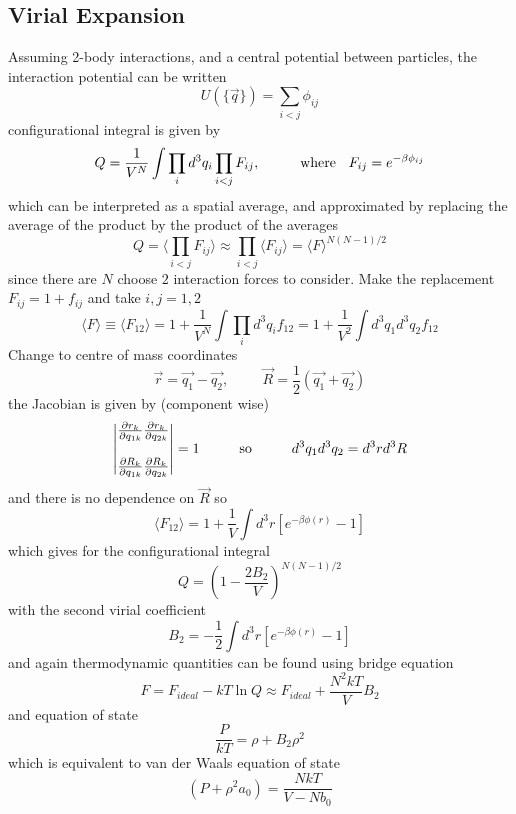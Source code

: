 \documentclass[table,cmyk]{article}
\begin{document}
\begin{longtable}
\section*{Virial Expansion}
Assuming 2-body interactions, and a central potential between particles, the interaction potential can be written
\[U(\{\vec{q}\})= \sum_{i<j} \phi_{ij}\]
configurational integral is given by
\[Q = \frac{1}{V^N}\int\prod_i d^3q_i \prod_{i<j} F_{ij}, \text{\hspace{1cm}where \hspace{0.2cm}} F_{ij} = e^{-\beta\phi_{ij}}\]
which can be interpreted as a spatial average, and approximated by replacing the average of the product by the product of the averages 
\[Q = \langle \prod_{i<j}F_{ij}\rangle \approx \prod_{i<j} \langle F_{ij}\rangle
= \langle F \rangle ^{N(N-1)/2}\]
since there are $N$ choose $2$ interaction forces to consider. Make the replacement $F_{ij} = 1+ f_{ij}$ and take $i,j = 1,2$
\[\langle F \rangle \equiv \langle F_{12} \rangle = 1 + \frac{1}{V^N} \int \prod_{i}d^3q_if_{12}
= 1+\frac{1}{V^2}\int d^3q_1d^3q_2f_{12}\]
Change to centre of mass coordinates
\[\vec{r} = \vec{q_1} - \vec{q_2}, \hspace{1cm} \vec{R} = \frac{1}{2}(\vec{q_1}+\vec{q_2})\]
the Jacobian is given by (component wise)
\[
\begin{vmatrix}
\frac{\partial r_k}{\partial q_{1k}} \frac{\partial r_k}{\partial q_{2k}}\\\\
\frac{\partial R_k}{\partial q_{1k}} \frac{\partial R_k}{\partial q_{2k}}
\end{vmatrix} = 1 \text{\hspace{1cm}so\hspace{1cm}} d^3q_1d^3q_2 = d^3rd^3R
\]
and there is no dependence on $\vec{R}$ so
\[ \langle F_{12}\rangle = 1+\frac{1}{V} \int d^3r [ e^{-\beta \phi(r)}-1]\]
which gives for the configurational integral
\[Q = \left(1-\frac{2B_2}{V}\right) ^{N(N-1)/2}\]
with the second virial coefficient
\[B_2 = -\frac{1}{2}\int d^3r[e^{-\beta\phi(r)}-1]\]
and again thermodynamic quantities can be found using bridge equation
\[F=F_{ideal}-kT\ln{Q} \approx F_{ideal} + \frac{N^2kT}{V}B_2\]
and equation of state
\[ \frac{P}{kT} = \rho + B_2\rho^2\]
which is equivalent to van der Waals equation of state
\[(P+\rho^2 a_0) = \frac{NkT}{V-Nb_0}\]
\tabularnewline\hline

\end{longtable}
\end{document}
